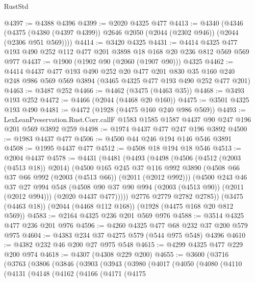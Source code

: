 \begin{lexlean}{RustStd}
\begin{coremodule}
@4397 := @4388 @4396
@4399 := @2020 @4325 @477
@4413 := @4340
    (@4346 (@4375 (@4380 (@4397 @4399)) @2646 @2050 (@2044 (@2302 @946)) (@2044 (@2306 @951 @569))))
@4414 := @3420 @4325
@4431 := @4414 @4325 @477 @193 @490 @252 @112 @477 @201 @3898 @18 @168 @20 @236 @812 @569 @569 @977
@4437 := @1900 (@1902 @90 (@2060 (@1907 @90))) @4325
@4462 := @4414
    @4437
    @477
    @193
    @490
    @252
    @20
    @477
    @201
    @830
    @35
    @160
    @240
    @248
    @986
    @569
    @569
    @3894
    (@3465 @4325 @477 @193 @490 @252 @477 @201)
@4463 := @3487 @252
@4466 := @4462 (@3475 (@4463 @35))
@4468 := @3493 @193 @252
@4472 := @4466 (@2044 (@4468 @20 @160))
@4475 := @3501 @4325 @193 @490
@4481 := @4472 (@1928 (@4475 @160 @240 @986 @569))
@4493 := LexLeanPreservation.Rust.Corr.callF
    @1583
    @1585
    @1587
    @4437
    @90
    @247
    @196
    @201
    @569
    @3892
    @259
@4498 := @1974 @4437 @477 @247 @196 @3892
@4500 := @1983 @4437 @477
@4506 := @4500 @44 @246 @194 @146 @546 @3891
@4508 := @1995 @4437 @477
@4512 := @4508 @18 @194 @18 @546
@4513 := @2004 @4437
@4578 := @4431
    (@4481
      (@4493
        (@4498
          (@4506
            (@4512 (@2003 (@4513 @18)) @2014)
            (@4500
              @165
              @245
              @37
              @116
              @992
              @3890
              (@4508 @66 @37 @66 @992 (@2003 (@4513 @66)) (@2011 (@2012 @992)))
              (@4500
                @243
                @46
                @37
                @27
                @994
                @548
                (@4508 @90 @37 @90 @994 (@2003 (@4513 @90)) (@2011 (@2012 @994)))
                (@2020 @4437 @477)))))
        @2776
        @2779
        @2782
        @2785))
    (@3475 (@4463 @18))
    (@2044 (@4468 @112 @168))
    (@1928 (@4475 @168 @20 @812 @569))
@4583 := @2164 @4325 @236 @201 @569 @976
@4588 := @3514 @4325 @477 @236 @201 @976
@4596 := @4260 @4325 @477 @68 @232 @37 @200 @579 @975
@4604 := @4383 @234 @37 @4275 @579 (@544 @975 @548) @4396
@4610 := @4382 @232 @46 @200 @27 @975 @548
@4615 := @4299 @4325 @477 @229 @200 @974
@4618 := @4307 (@4308 @229 @200)
@4655 := @3600
    (@3716
      (@3763
        (@3806
          (@3846
            (@3903
              (@3943
                (@3980
                  (@4017
                    (@4050
                      (@4080
                        (@4110
                          (@4131
                            (@4148
                              (@4162
                                (@4166
                                  (@4171
                                    (@4175

\end{coremodule}
\end{lexlean}
